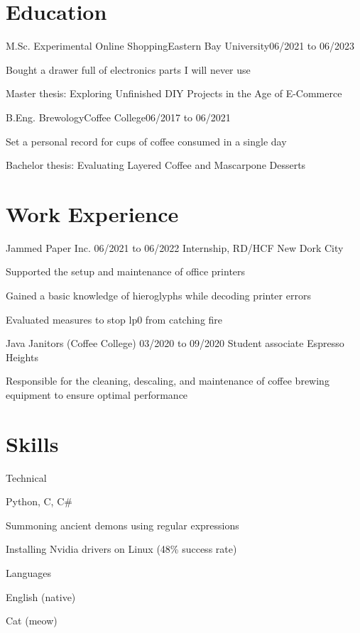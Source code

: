 \section{Education}
\begin{resumeList}{M.Sc. Experimental Online Shopping}{Eastern Bay University}{06/2021 to 06/2023}{}{}
	\item Bought a drawer full of electronics parts I will never use
	\item Master thesis: Exploring Unfinished DIY Projects in the Age of E-Commerce
\end{resumeList}
\begin{resumeList}{B.Eng. Brewology}{Coffee College}{06/2017 to 06/2021}{}{}
	\item Set a personal record for cups of coffee consumed in a single day
	\item Bachelor thesis: Evaluating Layered Coffee and Mascarpone Desserts
\end{resumeList}


\section{Work Experience}
\begin{resumeList}	{Jammed Paper Inc.}{}	{06/2021 to 06/2022}
	{Internship, RD/HCF}	{New Dork City}
	\item Supported the setup and maintenance of office printers
	\item Gained a basic knowledge of hieroglyphs while decoding printer errors
	\item Evaluated measures to stop lp0 from catching fire
\end{resumeList}
\begin{resumeList}	{Java Janitors (Coffee College)}{}	{03/2020 to 09/2020}
	{Student associate}					{Espresso Heights}
	\item Responsible for the cleaning, descaling, and maintenance of coffee brewing equipment to ensure optimal performance
\end{resumeList}


\section{Skills}
\begin{resumeList}{Technical}{}{}{}{}
	\item Python, C, C\#
	\item Summoning ancient demons using regular expressions
	\item Installing Nvidia drivers on Linux (48\% success rate)
\end{resumeList}

\begin{resumeList}{Languages}{}{}{}{}
	\item English (native)
	\item Cat (meow)
\end{resumeList}
